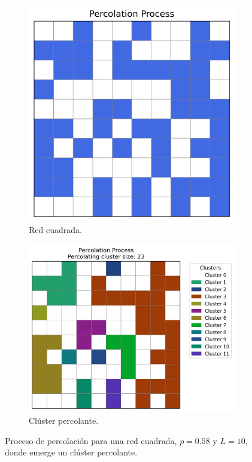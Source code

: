 \documentclass[12pt,a4paper]{article}
\begin{document}
\begin{figure}[H]
    \centering
    \begin{subfigure}[h]{0.4\textwidth}
        \centering
        \includegraphics[width=0.75\linewidth]{../figures/percolation2.png}
        \caption{Red cuadrada.}
        \label{fig:subfig1}
    \end{subfigure}
    \hspace{0.02 cm}
    \begin{subfigure}[h]{0.45\textwidth}
        \centering
        \includegraphics[width=0.9\linewidth]{../figures/clusterpercolation2.png}
        \caption{Clúster percolante.}
        \label{fig:subfig2}
    \end{subfigure}
    \caption{Proceso de percolación para una red cuadrada, \( p = 0.58 \) y \( L = 10 \), donde emerge un clúster percolante.}
    \label{fig:2}
\end{figure}
\end{document}
